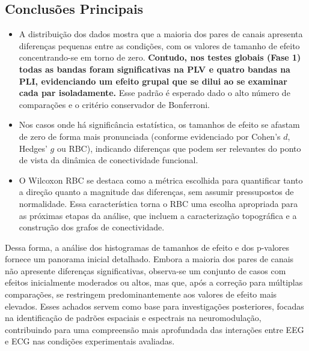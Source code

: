 \subsection{Conclusões Principais}
\begin{itemize}
    \item A distribuição dos dados mostra que a maioria dos pares de canais apresenta diferenças pequenas entre as condições, com os valores de tamanho de efeito concentrando-se em torno de zero. \textbf{Contudo, nos testes globais (Fase 1) todas as bandas foram significativas na PLV e quatro bandas na PLI, evidenciando um efeito grupal que se dilui ao se examinar cada par isoladamente.} Esse padrão é esperado dado o alto número de comparações e o critério conservador de Bonferroni.
    
    \item Nos casos onde há significância estatística, os tamanhos de efeito se afastam de zero de forma mais pronunciada (conforme evidenciado por Cohen's \(d\), Hedges' \(g\)  ou RBC), indicando diferenças que podem ser relevantes do ponto de vista da dinâmica de conectividade funcional.

    \item O Wilcoxon RBC se destaca como a métrica escolhida para quantificar tanto a direção quanto a magnitude das diferenças, sem assumir pressupostos de normalidade. Essa característica torna o RBC uma escolha apropriada para as próximas etapas da análise, que incluem a caracterização topográfica e a construção dos grafos de conectividade.

\end{itemize}

Dessa forma, a análise dos histogramas de tamanhos de efeito e dos p-valores fornece um panorama inicial detalhado. Embora a maioria dos pares de canais não apresente diferenças significativas, observa-se um conjunto de casos com efeitos inicialmente moderados ou altos, mas que, após a correção para múltiplas comparações, se restringem predominantemente aos valores de efeito mais elevados. Esses achados servem como base para investigações posteriores, focadas na identificação de padrões espaciais e espectrais na neuromodulação, contribuindo para uma compreensão mais aprofundada das interações entre EEG e ECG nas condições experimentais avaliadas.